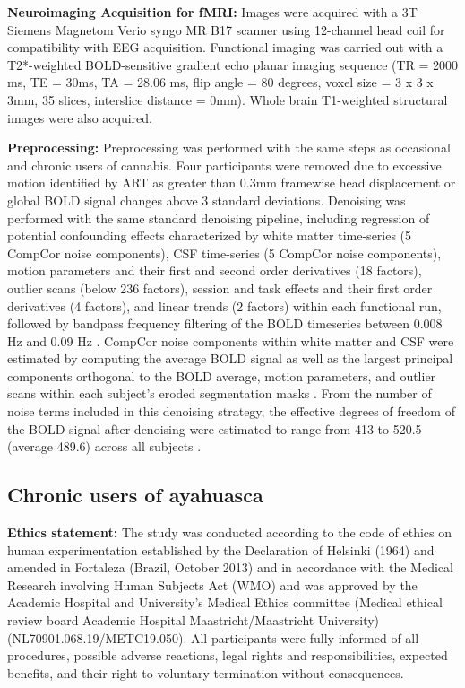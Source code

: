 \textbf{Neuroimaging Acquisition for fMRI:} Images were acquired with a
3T Siemens Magnetom Verio syngo MR B17 scanner using 12-channel head
coil for compatibility with EEG acquisition. Functional imaging was
carried out with a T2*-weighted BOLD-sensitive gradient echo planar
imaging sequence (TR = 2000 ms, TE = 30ms, TA = 28.06 ms, flip angle =
80 degrees, voxel size = 3 x 3 x 3mm, 35 slices, interslice distance =
0mm). Whole brain T1-weighted structural images were also acquired.

\textbf{Preprocessing:} Preprocessing was performed with the same steps
as occasional and chronic users of cannabis. Four participants were removed due to excessive motion identified by ART as greater than 0.3mm framewise head displacement or global BOLD signal changes above 3 standard deviations. Denoising was performed
with the same standard denoising pipeline, including regression of
potential confounding effects characterized by white matter time-series
(5 CompCor noise components), CSF time-series (5 CompCor noise
components), motion parameters and their first and second order
derivatives (18 factors), outlier scans (below 236 factors), session and
task effects and their first order derivatives (4 factors), and linear
trends (2 factors) within each functional run, followed by bandpass
frequency filtering of the BOLD timeseries between 0.008 Hz and 0.09 Hz \parencite{Friston1996,Hallquist2013,Nieto-Castanon2020,Power2014}. CompCor noise components within white matter
and CSF were estimated by computing the average BOLD signal as well as
the largest principal components orthogonal to the BOLD average, motion
parameters, and outlier scans within each subject's eroded segmentation
masks \parencite{Behzadi2007,Chai2012}. From the number of
noise terms included in this denoising strategy, the effective degrees
of freedom of the BOLD signal after denoising were estimated to range
from 413 to 520.5 (average 489.6) across all subjects \parencite{Nieto-Castanon2022a}.



\subsection{Chronic users of ayahuasca} 
\textbf{Ethics statement:} 
The study was conducted according to the code of ethics on human experimentation established by the Declaration of Helsinki (1964) and amended in Fortaleza (Brazil, October 2013) and in accordance with the Medical Research involving Human Subjects Act (WMO) and was approved by the Academic Hospital and University's Medical Ethics committee (Medical ethical review board Academic Hospital Maastricht/Maastricht University)\\ (NL70901.068.19/METC19.050). All participants were fully informed of all
procedures, possible adverse reactions, legal rights and
responsibilities, expected benefits, and their right to voluntary
termination without consequences.

